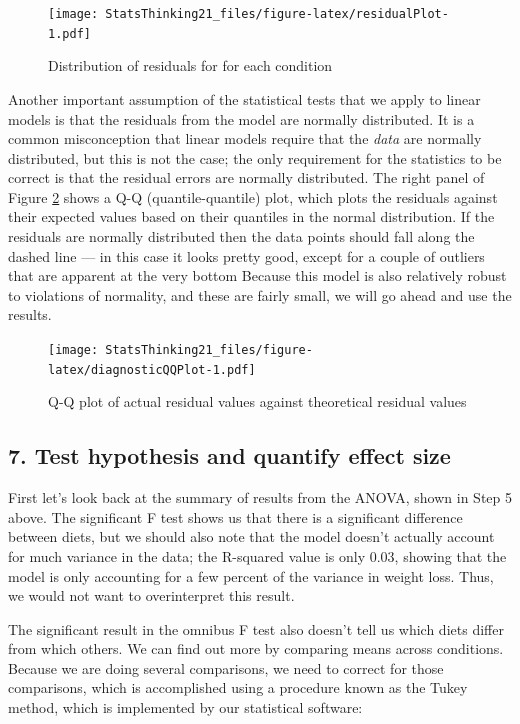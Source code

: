 \documentclass[12pt,]{book}
\theoremstyle{definition}
\theoremstyle{definition}
\theoremstyle{definition}
\theoremstyle{remark}
\begin{document}
\begin{figure}
\centering
\texttt{[image: StatsThinking21\_files/figure-latex/residualPlot-1.pdf]}
\caption{\label{fig:residualPlot}Distribution of residuals for for each condition}
\end{figure}

Another important assumption of the statistical tests that we apply to linear models is that the residuals from the model are normally distributed. It is a common misconception that linear models require that the \emph{data} are normally distributed, but this is not the case; the only requirement for the statistics to be correct is that the residual errors are normally distributed. The right panel of Figure \ref{fig:diagnosticQQPlot} shows a Q-Q (quantile-quantile) plot, which plots the residuals against their expected values based on their quantiles in the normal distribution. If the residuals are normally distributed then the data points should fall along the dashed line --- in this case it looks pretty good, except for a couple of outliers that are apparent at the very bottom Because this model is also relatively robust to violations of normality, and these are fairly small, we will go ahead and use the results.

\begin{figure}
\centering
\texttt{[image: StatsThinking21\_files/figure-latex/diagnosticQQPlot-1.pdf]}
\caption{\label{fig:diagnosticQQPlot}Q-Q plot of actual residual values against theoretical residual values}
\end{figure}

\hypertarget{test-hypothesis-and-quantify-effect-size}{%
\subsection{7. Test hypothesis and quantify effect size}\label{test-hypothesis-and-quantify-effect-size}}

First let's look back at the summary of results from the ANOVA, shown in Step 5 above. The significant F test shows us that there is a significant difference between diets, but we should also note that the model doesn't actually account for much variance in the data; the R-squared value is only 0.03, showing that the model is only accounting for a few percent of the variance in weight loss. Thus, we would not want to overinterpret this result.

The significant result in the omnibus F test also doesn't tell us which diets differ from which others. We can find out more by comparing means across conditions. Because we are doing several comparisons, we need to correct for those comparisons, which is accomplished using a procedure known as the Tukey method, which is implemented by our statistical software:
\end{document}
